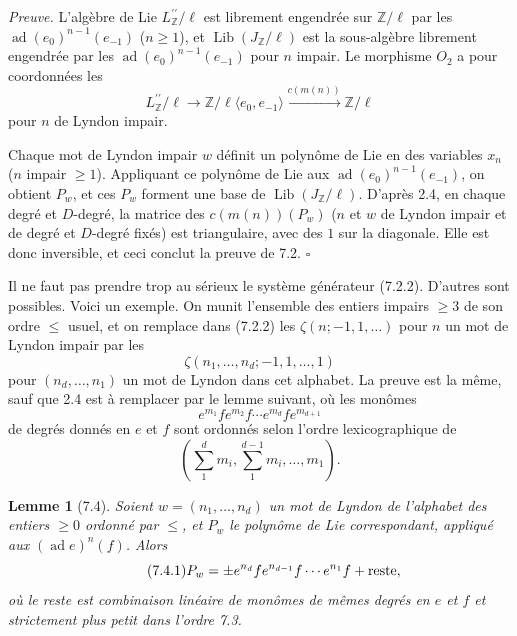 \documentclass[10pt,a4paper]{article}
\newcommand{\Z}{\mathbb Z}
\newcommand{\ad}{\operatorname{ad}}
\newcommand{\Lib}{\operatorname{Lib}}
\theoremstyle{deligne}
\newtheorem*{lemma*}{Lemme}
\newenvironment{proofdel}{\textit{Preuve.}}{\hfill$\square$}
\newcommand{\heading}[1]{\vspace{0.65em}\noindent{\bfseries #1}\quad}
\begin{document}
\begin{proofdel}
L'algèbre de Lie \(L^{\prime\prime}_\Z/\ell\) est librement engendrée sur \(\Z/\ell\) par les \(\ad(e_0)^{n-1}(e_{-1})\) (\(n\ge1\)), et \(\Lib(J_\Z/\ell)\) est la sous-algèbre librement engendrée par les \(\ad(e_0)^{n-1}(e_{-1})\) pour \(n\) impair. Le morphisme \(O_2\) a pour coordonnées les
\[
L^{\prime\prime}_\Z/\ell\longrightarrow \Z/\ell\langle e_0,e_{-1}\rangle
\xrightarrow{c(m(n))}\Z/\ell
\]
pour \(n\) de Lyndon impair.

Chaque mot de Lyndon impair \(w\) définit un polynôme de Lie en des variables \(x_n\) (\(n\) impair \(\ge1\)). Appliquant ce polynôme de Lie aux \(\ad(e_0)^{n-1}(e_{-1})\), on obtient \(P_w\), et ces \(P_w\) forment une base de \(\Lib(J_\Z/\ell)\). D'après 2.4, en chaque degré et \(D\)-degré, la matrice des \(c(m(n))(P_w)\) (\(n\) et \(w\) de Lyndon impair et de degré et \(D\)-degré fixés) est triangulaire, avec des \(1\) sur la diagonale. Elle est donc inversible, et ceci conclut la preuve de 7.2.
\end{proofdel}

\heading{7.3.} Il ne faut pas prendre trop au sérieux le système générateur (7.2.2). D'autres sont possibles. Voici un exemple. On munit l'ensemble des entiers impairs \(\ge3\) de son ordre \(\le\) usuel, et on remplace dans (7.2.2) les \(\zeta(n;-1,1,\ldots)\) pour \(n\) un mot de Lyndon impair par les
\[
\zeta(n_1,\ldots,n_d;-1,1,\ldots,1)
\]
pour \((n_d,\ldots,n_1)\) un mot de Lyndon dans cet alphabet. La preuve est la même, sauf que 2.4 est à remplacer par le lemme suivant, où les monômes
\[
e^{m_1}fe^{m_2}f\cdots e^{m_d}fe^{m_{d+1}}
\]
de degrés donnés en \(e\) et \(f\) sont ordonnés selon l'ordre lexicographique de
\[
\left(\sum_{1}^{d}m_i,\sum_{1}^{d-1}m_i,\ldots,m_1\right).
\]

\begin{lemma*}[7.4]
Soient \(w=(n_1,\ldots,n_d)\) un mot de Lyndon de l'alphabet des entiers \(\ge0\) ordonné par \(\le\), et \(P_w\) le polynôme de Lie correspondant, appliqué aux \((\ad e)^n(f)\). Alors
\[
\tag{7.4.1}
P_w=\pm e^{n_d}fe^{n_{d-1}}f\cdots e^{n_1}f+\hbox{reste},
\]
où le reste est combinaison linéaire de monômes de mêmes degrés en \(e\) et \(f\) et strictement plus petit dans l'ordre 7.3.
\end{lemma*}
\end{document}
